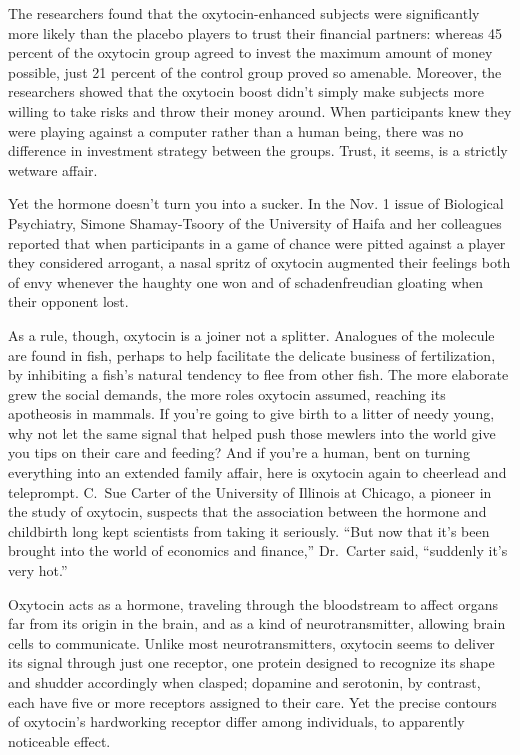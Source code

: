 ﻿\documentclass[12pt]{article}
\begin{document}
The researchers found that the oxytocin-enhanced subjects were significantly more likely than the
placebo players to trust their financial partners: whereas 45 percent of the oxytocin group agreed
to invest the maximum amount of money possible, just 21 percent of the control group proved so
amenable. Moreover, the researchers showed that the oxytocin boost didn't simply make subjects more
willing to take risks and throw their money around. When participants knew they were playing against
a computer rather than a human being, there was no difference in investment strategy between the
groups. Trust, it seems, is a strictly wetware affair.

Yet the hormone doesn't turn you into a sucker. In the Nov. 1 issue of Biological Psychiatry, Simone
Shamay-Tsoory of the University of Haifa and her colleagues reported that when participants in a
game of chance were pitted against a player they considered arrogant, a nasal spritz of oxytocin
augmented their feelings both of envy whenever the haughty one won and of schadenfreudian gloating
when their opponent lost.

As a rule, though, oxytocin is a joiner not a splitter. Analogues of the molecule are found in fish,
perhaps to help facilitate the delicate business of fertilization, by inhibiting a fish's natural
tendency to flee from other fish. The more elaborate grew the social demands, the more roles
oxytocin assumed, reaching its apotheosis in mammals. If you're going to give birth to a litter of
needy young, why not let the same signal that helped push those mewlers into the world give you tips
on their care and feeding? And if you're a human, bent on turning everything into an extended family
affair, here is oxytocin again to cheerlead and teleprompt. C.~Sue Carter of the University of
Illinois at Chicago, a pioneer in the study of oxytocin, suspects that the association between the
hormone and childbirth long kept scientists from taking it seriously. ``But now that it's been
brought into the world of economics and finance,'' Dr.~Carter said, ``suddenly it's very hot.''

Oxytocin acts as a hormone, traveling through the bloodstream to affect organs far from its origin
in the brain, and as a kind of neurotransmitter, allowing brain cells to communicate. Unlike most
neurotransmitters, oxytocin seems to deliver its signal through just one receptor, one protein
designed to recognize its shape and shudder accordingly when clasped; dopamine and serotonin, by
contrast, each have five or more receptors assigned to their care. Yet the precise contours of
oxytocin's hardworking receptor differ among individuals, to apparently noticeable effect.
\end{document}
